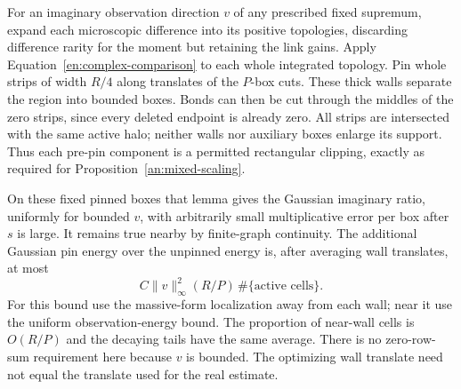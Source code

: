 For an imaginary observation direction $v$ of any prescribed fixed
supremum, expand each microscopic difference into its positive
topologies, discarding difference rarity for the moment but retaining
the link gains.  Apply Equation~\eqref{en:complex-comparison} to each
whole integrated topology.  Pin whole strips of width $R/4$ along
translates of the $P$-box cuts.  These thick walls separate the region
into bounded boxes.  Bonds can then be cut through the middles of the
zero strips, since every deleted endpoint is already zero.  All strips
are intersected with the same active halo; neither walls nor auxiliary
boxes enlarge its support.  Thus each pre-pin component is a permitted rectangular clipping, exactly as
required for Proposition~\ref{an:mixed-scaling}.

On these fixed pinned boxes that lemma gives the Gaussian imaginary
ratio, uniformly for bounded $v$, with arbitrarily small multiplicative
error per box after $s$ is large.  It remains true nearby by finite-graph
continuity.  The additional Gaussian pin energy over the unpinned
energy is, after averaging wall translates, at most
\begin{equation}\label{en:imaginary-wall}
       C\|v\|_\infty^2(R/P)\,\#\{\text{active cells}\}.
\end{equation}
For this bound use the massive-form localization away from each wall;
near it use the uniform observation-energy bound.  The proportion
of near-wall cells is $O(R/P)$ and the decaying tails have the same
average.  There is no zero-row-sum requirement here because $v$ is
bounded.  The optimizing wall translate need not equal the translate
used for the real estimate.

